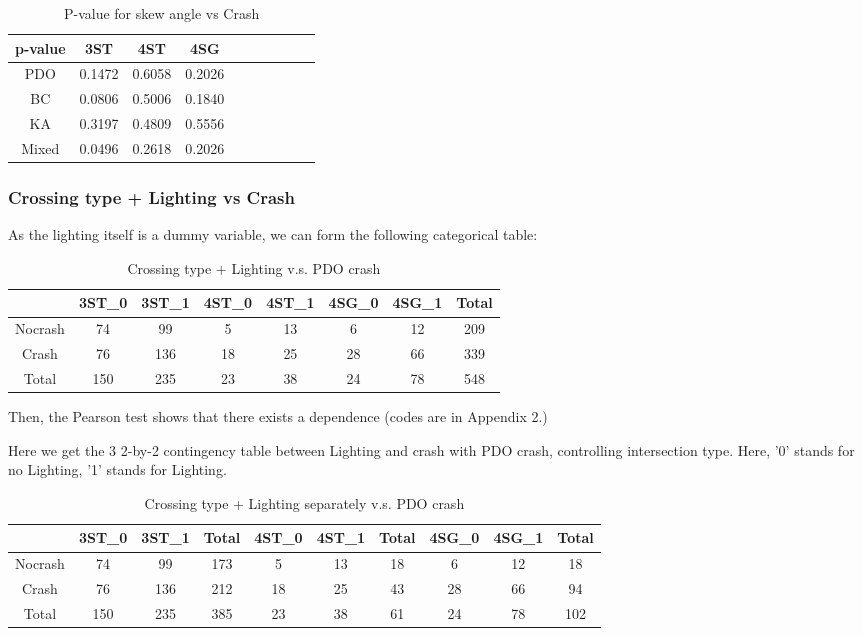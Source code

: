 \documentclass[11pt]{scrartcl} %
\begin{document}
\begin{table}[H]
\caption{P-value for skew angle vs Crash}
\centering
\begin{tabular}{|c|c|c|c|c|c|c|c|c|c|}
\hline
p-value & 3ST & 4ST & 4SG  \\
\hline
PDO & 0.1472 & 0.6058 & 0.2026 \\
\hline
BC & 0.0806 & 0.5006 & 0.1840\\
\hline
KA & 0.3197  & 0.4809 & 0.5556 \\
\hline
Mixed & 0.0496 & 0.2618 & 0.2026 \\
\hline
\end{tabular}
\end{table}



\subsubsection{Crossing type + Lighting vs Crash}

As the lighting itself is a dummy variable, we can form the following categorical table:

\begin{table}[H]
\caption{Crossing type + Lighting v.s. PDO crash}
\centering
\begin{tabular}{|c|c|c|c|c|c|c|c|}
\hline
      & 3ST\_0 & 3ST\_1 & 4ST\_0 & 4ST\_1 & 4SG\_0 & 4SG\_1 & Total \\
\hline
Nocrash & 74 & 99 & 5 & 13 & 6 & 12 & 209\\
\hline
Crash    & 76  & 136  & 18 & 25 & 28 & 66 & 339\\
\hline
Total    & 150  & 235  & 23  & 38 & 24 & 78 & 548 \\
\hline
\end{tabular}
\end{table}

Then, the Pearson test shows that there exists a dependence (codes are in Appendix 2.)

Here we get the 3 2-by-2 contingency table between Lighting and crash with PDO crash, controlling intersection type. Here, '0' stands for no Lighting, '1' stands for Lighting.

\begin{table}[H]
\caption{Crossing type + Lighting separately v.s. PDO crash}
\centering
\begin{tabular}{|c|c|c|c|c|c|c|c|c|c|}
\hline
      & 3ST\_0 & 3ST\_1 & Total & 4ST\_0 & 4ST\_1 & Total & 4SG\_0 & 4SG\_1 & Total \\
\hline
Nocrash & 74 & 99 & 173 & 5 & 13 & 18 & 6 & 12 & 18\\
\hline
Crash    & 76  & 136 & 212 & 18 & 25 & 43 & 28 & 66 & 94\\
\hline
Total    & 150  & 235 & 385 & 23  & 38 & 61 & 24 & 78 & 102\\
\hline
\end{tabular}
\end{table}
\end{document}
